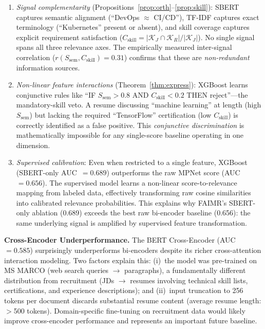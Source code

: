 \documentclass{llncs}
\begin{document}
\begin{enumerate}
    \item \textit{Signal complementarity} (Propositions~\ref{prop:orth}--\ref{prop:skill}): SBERT captures semantic alignment (``DevOps $\approx$ CI/CD''), TF-IDF captures exact terminology (``Kubernetes'' present or absent), and skill coverage captures explicit requirement satisfaction ($C_\text{skill} = |\mathcal{K}_J \cap \mathcal{K}_R|/|\mathcal{K}_J|$). No single signal spans all three relevance axes. The empirically measured inter-signal correlation ($r(S_\text{sem}, C_\text{skill}) = 0.31$) confirms that these are \textit{non-redundant} information sources.

    \item \textit{Non-linear feature interactions} (Theorem~\ref{thm:express}): XGBoost learns conjunctive rules like ``IF $S_\text{sem} > 0.8$ AND $C_\text{skill} < 0.2$ THEN reject''---the mandatory-skill veto. A resume discussing ``machine learning'' at length (high $S_\text{sem}$) but lacking the required ``TensorFlow'' certification (low $C_\text{skill}$) is correctly identified as a false positive. This \textit{conjunctive discrimination} is mathematically impossible for any single-score baseline operating in one dimension.

    \item \textit{Supervised calibration}: Even when restricted to a single feature, XGBoost (SBERT-only AUC~$= 0.689$) outperforms the raw MPNet score (AUC~$= 0.656$). The supervised model learns a non-linear score-to-relevance mapping from labeled data, effectively transforming raw cosine similarities into calibrated relevance probabilities. This explains why FAIMR's SBERT-only ablation (0.689) exceeds the best raw bi-encoder baseline (0.656): the same underlying signal is amplified by supervised feature transformation.
\end{enumerate}

\textbf{Cross-Encoder Underperformance.} The BERT Cross-Encoder (AUC~$= 0.585$) surprisingly underperforms bi-encoders despite its richer cross-attention interaction modeling. Two factors explain this: (i)~the model was pre-trained on MS MARCO (web search queries $\to$ paragraphs), a fundamentally different distribution from recruitment (JDs $\to$ resumes involving technical skill lists, certifications, and experience descriptions); and (ii)~input truncation to 256 tokens per document discards substantial resume content (average resume length: $>$500 tokens). Domain-specific fine-tuning on recruitment data would likely improve cross-encoder performance and represents an important future baseline.
\end{document}

